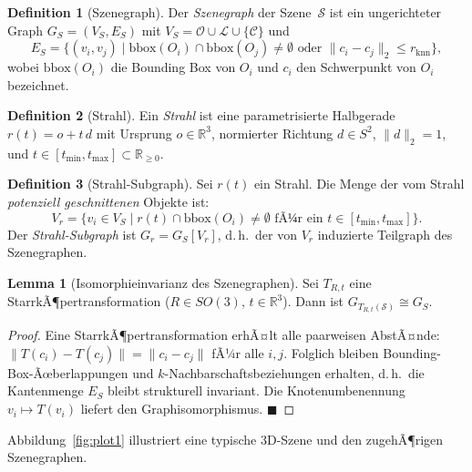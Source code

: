 ﻿\documentclass[a4paper,12pt]{article}
\theoremstyle{definition}
\newtheorem{definition}{Definition}[section]
\newtheorem{lemma}{Lemma}[section]
\begin{document}
\begin{definition}[Szenegraph]
  \label{def:szenegraph}
  Der \emph{Szenegraph} der Szene~$\mathcal{S}$ ist ein ungerichteter
  Graph $G_S = (V_S, E_S)$ mit
  $V_S = \mathcal{O} \cup \mathcal{L} \cup \{\mathcal{C}\}$ und
  \[
    E_S = \bigl\{(v_i, v_j) \;\big|\;
    \mathrm{bbox}(O_i) \cap \mathrm{bbox}(O_j) \neq \emptyset
    \text{ oder } \|c_i - c_j\|_2 \leq r_{\mathrm{knn}}\bigr\},
  \]
  wobei $\mathrm{bbox}(O_i)$ die Bounding Box von $O_i$ und $c_i$
  den Schwerpunkt von $O_i$ bezeichnet.
\end{definition}

\begin{definition}[Strahl]
  \label{def:strahl}
  Ein \emph{Strahl} ist eine parametrisierte Halbgerade
  $r(t) = o + t\,d$ mit Ursprung $o \in \mathbb{R}^3$,
  normierter Richtung $d \in S^2$, $\|d\|_2 = 1$, und
  $t \in [t_{\min}, t_{\max}] \subset \mathbb{R}_{\geq 0}$.
\end{definition}

\begin{definition}[Strahl-Subgraph]
  \label{def:strahl_subgraph}
  Sei $r(t)$ ein Strahl. Die Menge der vom Strahl
  \emph{potenziell geschnittenen} Objekte ist:
  \[
    V_r = \bigl\{v_i \in V_S \;\big|\;
    r(t) \cap \mathrm{bbox}(O_i) \neq \emptyset
    \text{ fÃ¼r ein } t \in [t_{\min}, t_{\max}]\bigr\}.
  \]
  Der \emph{Strahl-Subgraph} ist $G_r = G_S[V_r]$, d.\,h.\ der von
  $V_r$ induzierte Teilgraph des Szenegraphen.
\end{definition}

\begin{lemma}[Isomorphieinvarianz des Szenegraphen]
  \label{lem:szene_invarianz}
  Sei $T_{R,t}$ eine StarrkÃ¶pertransformation
  ($R \in SO(3)$, $t \in \mathbb{R}^3$). Dann ist
  $G_{T_{R,t}(\mathcal{S})} \cong G_S$.
\end{lemma}

\begin{proof}
  Eine StarrkÃ¶pertransformation erhÃ¤lt alle paarweisen AbstÃ¤nde:
  $\|T(c_i) - T(c_j)\| = \|c_i - c_j\|$ fÃ¼r alle $i, j$.
  Folglich bleiben Bounding-Box-Ãœberlappungen und
  $k$-Nachbarschaftsbeziehungen erhalten, d.\,h.\ die Kantenmenge
  $E_S$ bleibt strukturell invariant. Die Knotenumbenennung
  $v_i \mapsto T(v_i)$ liefert den Graphisomorphismus.
  \hfill$\blacksquare$
\end{proof}

Abbildung~\ref{fig:plot1} illustriert eine typische 3D-Szene und
den zugehÃ¶rigen Szenegraphen.
\end{document}
